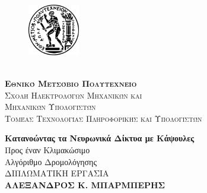 \begin{titlepage}
    
    \thispagestyle{empty}    

    \vspace*{-1cm}
    
    \begingroup
        \setlength{\intextsep}{0pt}
        \setlength{\columnsep}{20pt}
        
        \begin{figure}
        \centering
        \includegraphics[width=0.2\textwidth]{images/logo/pyrforos.eps}
        
        \end{figure}
        \phantom{}\\[-7pt] %
        \LARGE{\textsc{\textbf{Εθνικό Μετσόβιο Πολυτεχνείο}}}\\[5pt]
        \Large{\textsc{Σχολή Ηλεκτρολόγων Μηχανικών
        και\\ Μηχανικών Υπολογιστών}}\\[5pt]
        \Large{\textsc{Τομέας Τεχνολογίας Πληροφορικής και Υπολογιστών}}

    \endgroup

    \begin{center}

        
        \vspace*{2cm}
            
        \Huge
        \textbf{Κατανοώντας τα Νευρωνικά Δίκτυα με Κάψουλες}\\
            
        \vspace{0.5cm}
        \LARGE
        Προς έναν Κλιμακώσιμο\\ Αλγόριθμο Δρομολόγησης\\
            
        \vfill
        ΔΙΠΛΩΜΑΤΙΚΗ ΕΡΓΑΣΙΑ\\
        \vspace{0.8cm}
        \LARGE
        \textbf{ΑΛΕΞΑΝΔΡΟΣ Κ. ΜΠΑΡΜΠΕΡΗΣ}\\


\end{center}
\end{titlepage}
